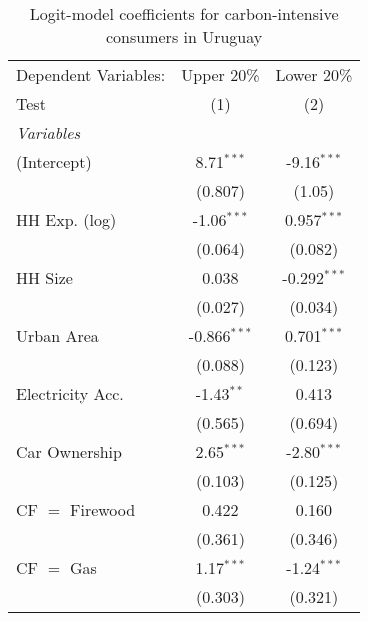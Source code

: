 
\begin{table}[htbp!]
   \centering
   \small
   \begin{adjustbox}{width = 1\textwidth, max height = 0.95\textheight, center}
      \begin{threeparttable}[b]
         \caption{\label{tab:Logit_1_URY} Logit-model coefficients for carbon-intensive consumers in Uruguay}
         \begin{tabular}{lcc}
            \tabularnewline \midrule \midrule
            Dependent Variables:      & Upper 20\%     & Lower 20\%\\   
            Test                      & (1)            & (2)\\  
            \midrule
            \emph{Variables}\\
            (Intercept)               & 8.71$^{***}$   & -9.16$^{***}$\\   
                                      & (0.807)        & (1.05)\\   
            HH Exp. (log)             & -1.06$^{***}$  & 0.957$^{***}$\\   
                                      & (0.064)        & (0.082)\\   
            HH Size                   & 0.038          & -0.292$^{***}$\\   
                                      & (0.027)        & (0.034)\\   
            Urban Area                & -0.866$^{***}$ & 0.701$^{***}$\\   
                                      & (0.088)        & (0.123)\\   
            Electricity Acc.          & -1.43$^{**}$   & 0.413\\   
                                      & (0.565)        & (0.694)\\   
            Car Ownership             & 2.65$^{***}$   & -2.80$^{***}$\\   
                                      & (0.103)        & (0.125)\\   
            CF $=$ Firewood           & 0.422          & 0.160\\   
                                      & (0.361)        & (0.346)\\   
            CF $=$ Gas                & 1.17$^{***}$   & -1.24$^{***}$\\   
                                      & (0.303)        & (0.321)\\   

\end{tabular}
\end{threeparttable}
\end{adjustbox}
\end{table}
